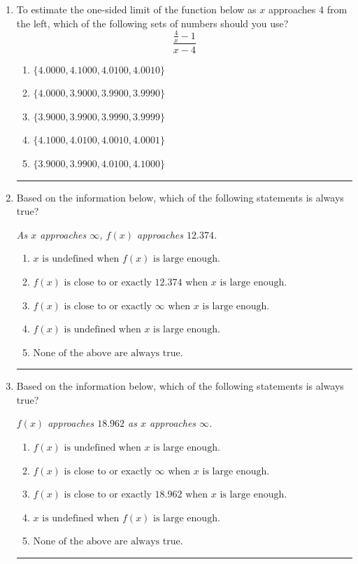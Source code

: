 \documentclass[14pt]{extbook}
\newcommand{\litem}[1]{\item#1\hspace*{-1cm}\rule{\textwidth}{0.4pt}}
\begin{document}
\begin{enumerate}
{\begin{enumerate}[label=\Alph*.]
\end{enumerate} }
\litem{
To estimate the one-sided limit of the function below as $x$ approaches 4 from the left, which of the following sets of numbers should you use?\[ \frac{\frac{4}{x} - 1}{x - 4} \]\begin{enumerate}[label=\Alph*.]
\item \( \{ 4.0000, 4.1000, 4.0100, 4.0010 \} \)
\item \( \{ 4.0000, 3.9000, 3.9900, 3.9990 \} \)
\item \( \{ 3.9000, 3.9900, 3.9990, 3.9999 \} \)
\item \( \{ 4.1000, 4.0100, 4.0010, 4.0001 \} \)
\item \( \{ 3.9000, 3.9900, 4.0100, 4.1000 \} \)

\end{enumerate} }
\litem{
Based on the information below, which of the following statements is always true?
\begin{center}
    \textit{ As $x$ approaches $\infty$, $f(x)$ approaches $12.374$. }
\end{center}
\begin{enumerate}[label=\Alph*.]
\item \( x \text{ is undefined when } f(x) \text{ is large enough}. \)
\item \( f(x) \text{ is close to or exactly } 12.374 \text{ when } x \text{ is large enough}. \)
\item \( f(x) \text{ is close to or exactly } \infty \text{ when } x \text{ is large enough}. \)
\item \( f(x) \text{ is undefined when } x \text{ is large enough}. \)
\item \( \text{None of the above are always true.} \)

\end{enumerate} }
\litem{
Based on the information below, which of the following statements is always true?
\begin{center}
    \textit{ $f(x)$ approaches $18.962$ as $x$ approaches $\infty$. }
\end{center}
\begin{enumerate}[label=\Alph*.]
\item \( f(x) \text{ is undefined when } x \text{ is large enough}. \)
\item \( f(x) \text{ is close to or exactly } \infty \text{ when } x \text{ is large enough}. \)
\item \( f(x) \text{ is close to or exactly } 18.962 \text{ when } x \text{ is large enough}. \)
\item \( x \text{ is undefined when } f(x) \text{ is large enough}. \)
\item \( \text{None of the above are always true.} \)


\end{enumerate}}
\end{enumerate}
\end{document}
